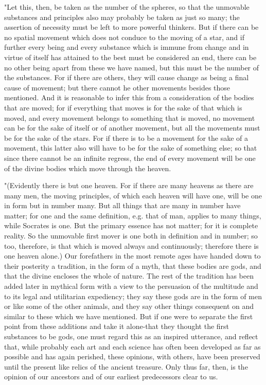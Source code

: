 "Let this, then, be taken as the number of the spheres, so that the
unmovable substances and principles also may probably be taken as
just so many; the assertion of necessity must be left to more powerful
thinkers. But if there can be no spatial movement which does not conduce
to the moving of a star, and if further every being and every substance
which is immune from change and in virtue of itself has attained to
the best must be considered an end, there can be no other being apart
from these we have named, but this must be the number of the substances.
For if there are others, they will cause change as being a final cause
of movement; but there cannot he other movements besides those mentioned.
And it is reasonable to infer this from a consideration of the bodies
that are moved; for if everything that moves is for the sake of that
which is moved, and every movement belongs to something that is moved,
no movement can be for the sake of itself or of another movement,
but all the movements must be for the sake of the stars. For if there
is to be a movement for the sake of a movement, this latter also will
have to be for the sake of something else; so that since there cannot
be an infinite regress, the end of every movement will be one of the
divine bodies which move through the heaven. 

"(Evidently there is but one heaven. For if there are many heavens
as there are many men, the moving principles, of which each heaven
will have one, will be one in form but in number many. But all things
that are many in number have matter; for one and the same definition,
e.g. that of man, applies to many things, while Socrates is one. But
the primary essence has not matter; for it is complete reality. So
the unmovable first mover is one both in definition and in number;
so too, therefore, is that which is moved always and continuously;
therefore there is one heaven alone.) Our forefathers in the most
remote ages have handed down to their posterity a tradition, in the
form of a myth, that these bodies are gods, and that the divine encloses
the whole of nature. The rest of the tradition has been added later
in mythical form with a view to the persuasion of the multitude and
to its legal and utilitarian expediency; they say these gods are in
the form of men or like some of the other animals, and they say other
things consequent on and similar to these which we have mentioned.
But if one were to separate the first point from these additions and
take it alone-that they thought the first substances to be gods, one
must regard this as an inspired utterance, and reflect that, while
probably each art and each science has often been developed as far
as possible and has again perished, these opinions, with others, have
been preserved until the present like relics of the ancient treasure.
Only thus far, then, is the opinion of our ancestors and of our earliest
predecessors clear to us. 

